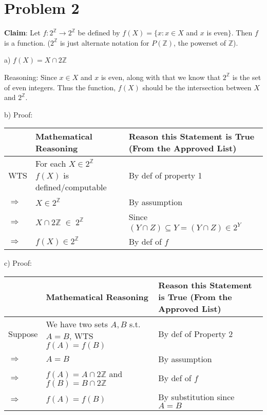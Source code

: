 \documentclass{article}
\begin{document}
\pagebreak

\section{Problem 2}
\textbf{Claim}: Let $f : 2^\mathbb{Z} \rightarrow 2^\mathbb{Z}$ be defined by $f(X) = \{x : x\in X$ and $x$ is even$\}$. Then $f$ is a function. ($2^\mathbb{Z}$ is just alternate notation for $P(\mathbb{Z})$, the powerset of $\mathbb{Z}$).\vspace{10pt}

a) $f(X) = X\cap 2\mathbb{Z}$ \vspace{3pt}

Reasoning: Since $x\in X$ and $x$ is even, along with that we know that $2^\mathbb{Z}$ is the set of even integers. Thus the function, $f(X)$ should be the intersection between $X$ and $2^\mathbb{Z}$.\vspace{10pt}

b) Proof: 
\begin{flushleft}
    \begin{tabular}{|p{1.3cm}|p{3.4cm}|p{5.8cm}|}
        \hline
         & \textbf{Mathematical Reasoning} & \textbf{Reason this Statement is True (From the Approved List)} \\
         \hline
         WTS & For each $X\in2^\mathbb{Z}$ $f(X)$ is defined/computable & By def of property 1 \\
         \hline
         $\Rightarrow$ & $X\in 2^\mathbb{Z}$ & By assumption \\
         \hline
         $\Rightarrow$ & $X\cap 2\mathbb{Z}\mathbb\;\in\;2^\mathbb{Z}$ & Since $(Y\cap Z)\subseteq Y=(Y\cap Z)\in2^Y$ \\
         \hline
         $\Rightarrow$ & $f(X)\in2^\mathbb{Z}$  & By def of $f$\\
         \hline
    \end{tabular}
\end{flushleft}\vspace{10pt}

c) Proof:
\begin{flushleft}
    \begin{tabular}{|p{1.3cm}|p{3.4cm}|p{5.8cm}|}
         \hline
          & \textbf{Mathematical Reasoning} & \textbf{Reason this Statement is True (From the Approved List)} \\
          \hline
          Suppose & We have two sets $A,B$ s.t. $A=B$, WTS $f(A)=f(B)$ & By def of Property 2 \\
          \hline
          $\Rightarrow$ & $A=B$ & By assumption \\
          \hline
          $\Rightarrow$ & $f(A)=A\cap 2\mathbb{Z}$ and $f(B)=B\cap 2\mathbb{Z}$ & By def of $f$\\
          \hline
          $\Rightarrow$ & $f(A)=f(B)$ & By substitution since $A=B$ \\
          \hline 
    \end{tabular}
\end{flushleft}\vspace{10pt}
\end{document}
